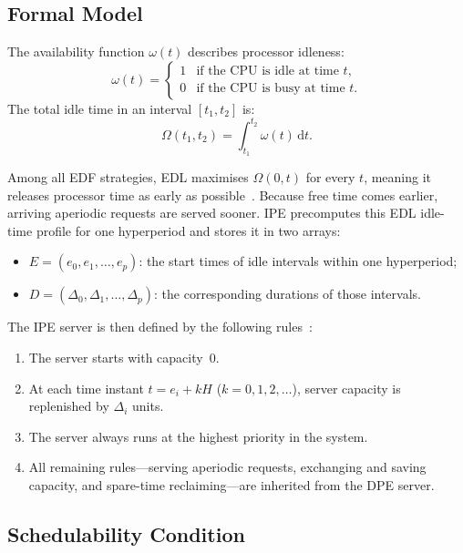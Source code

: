 \documentclass[conference]{IEEEtran}
\begin{document}
\subsection{Formal Model}

The availability function $\omega(t)$ describes processor
idleness:
\begin{equation}
  \omega(t) =
  \begin{cases}
    1 & \text{if the CPU is idle at time } t,\\
    0 & \text{if the CPU is busy at time } t.
  \end{cases}
\end{equation}
The total idle time in an interval $[t_1,t_2]$ is:
\begin{equation}
  \Omega(t_1,t_2) = \int_{t_1}^{t_2} \omega(t)\,\mathrm{d}t.
\end{equation}

Among all EDF strategies, EDL maximises $\Omega(0,t)$ for
every $t$, meaning it releases processor time as early as
possible~\cite{chetto1989}. Because free time comes earlier,
arriving aperiodic requests are served sooner. IPE
precomputes this EDL idle-time profile for one hyperperiod
and stores it in two arrays:
\begin{itemize}
  \item $E = (e_0, e_1, \ldots, e_p)$: the start times of
    idle intervals within one hyperperiod;
  \item $D = (\Delta_0, \Delta_1, \ldots, \Delta_p)$: the
    corresponding durations of those intervals.
\end{itemize}

The IPE server is then defined by the following
rules~\cite{spuri1996}:
\begin{enumerate}
  \item The server starts with capacity~$0$.
  \item At each time instant $t = e_i + kH$
    ($k = 0,1,2,\ldots$), server capacity is replenished
    by $\Delta_i$ units.
  \item The server always runs at the highest priority
    in the system.
  \item All remaining rules---serving aperiodic requests,
    exchanging and saving capacity, and spare-time
    reclaiming---are inherited from the DPE server.
\end{enumerate}

\subsection{Schedulability Condition}
\end{document}
